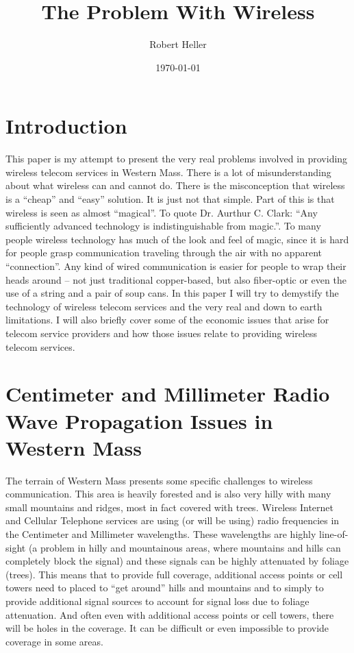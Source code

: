 \documentclass[12pt]{article}
\title{The Problem With Wireless}
\author{Robert Heller}
\date{\today}
\begin{document}
\maketitle

\tableofcontents


\section{Introduction}

This paper is my attempt to present the very real problems involved in 
providing wireless telecom services in Western Mass.  There is a lot of 
misunderstanding about what wireless can and cannot do.  There is the 
misconception that wireless is a ``cheap'' and ``easy'' solution.  It is just 
not that simple.  Part of this is that wireless is seen as almost ``magical''. 
To quote Dr. Aurthur C. Clark: ``Any sufficiently advanced technology is 
indistinguishable from magic.''.  To many people wireless technology has much of 
the look and feel of magic, since it is hard for people grasp communication 
traveling through the air with no apparent ``connection''.  Any kind of wired 
communication is easier for people to wrap their heads around -- not just 
traditional copper-based, but also fiber-optic or even the use of a string and 
a pair of soup cans.  In this paper I will try to demystify the technology of 
wireless telecom services and the very real and down to earth limitations.  I 
will also briefly cover some of the economic issues that arise for telecom 
service providers and how those issues relate to providing wireless telecom 
services.


\section{Centimeter and Millimeter Radio Wave Propagation Issues in Western Mass}

The terrain of Western Mass presents some specific challenges to wireless
communication. This area is heavily forested and is also very hilly with many
small mountains and ridges, most in fact covered with trees. Wireless Internet
and Cellular Telephone services are using (or will be using) radio frequencies
in the Centimeter and Millimeter wavelengths. These wavelengths are highly
line-of-sight (a problem in hilly and mountainous areas, where mountains and
hills can completely block the signal) and these signals can be highly
attenuated by foliage (trees)\cite{Effect.IJCA.0975-8887}. This means that to
provide full coverage, additional access points or cell towers need to placed
to ``get around'' hills and mountains and to simply to provide additional
signal sources to account for signal loss due to foliage attenuation. And
often even with additional access points or cell towers, there will be
holes in the coverage. It can be difficult or even impossible to provide
coverage in some areas.
\end{document}
